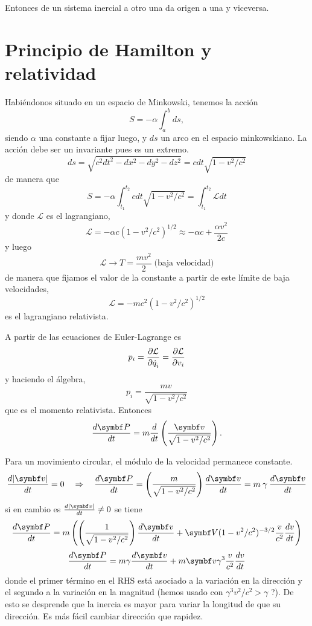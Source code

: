 \documentclass[10pt,oneside]{CBFT_book}
\begin{document}
Entonces de un sistema inercial a otro una  da origen a una  y viceversa.

\section{Principio de Hamilton y relatividad}

Habiéndonos situado en un espacio de Minkowski, tenemos la acción
\[
	S = -\alpha \int_a^b ds,
\]
siendo $\alpha$ una constante a fijar luego, y $ds$ un arco en el espacio minkowskiano. La acción debe ser 
un invariante pues es un extremo.
\[
	ds = \sqrt{ c^2 dt^2 - dx^2 - dy^2 - dz^2 } = c dt \sqrt{ 1 - v^2/c^2 }
\]
de manera que 
\[
	S = -\alpha \int_{t_1}^{t_2} c dt  \sqrt{ 1 - v^2/c^2 } = \int_{t_1}^{t_2} \mathcal{L} dt
\]
y donde $\mathcal{L}$ es el lagrangiano, 
\[
	\mathcal{L} = -\alpha c \left( 1 - v^2/c^2 \right)^{1/2} \approx -\alpha c + \frac{\alpha v^2}{2c}
\]
y luego 
\[
	\mathcal{L} \to T = \frac{m v^2}{2} \; \text{(baja velocidad)}
\]
de manera que fijamos el valor de la constante a partir de este límite de baja velocidades,
\[
	\mathcal{L} = -m c^2 \left( 1 - v^2/c^2 \right)^{1/2}
\]
es el lagrangiano relativista.

A partir de las ecuaciones de Euler-Lagrange es 
\[
	p_i = \frac{\partial^{\hspace{-0.05em}} {\mathcal{L}}}{\partial {\dot{q}_i}^{\hspace{-0.05em}}} = \frac{\partial^{\hspace{-0.05em}} {\mathcal{L}}}{\partial {v_i}^{\hspace{-0.05em}}}
\]
y haciendo el álgebra,
\[
	p_i = \frac{ m v }{\sqrt{ 1 - v^2/c^2 }}
\]
que es el momento relativista. Entonces
\[
	\dtot{\vb{P}}{t} = m \dtot{}{t}\left( \frac{\vb{v}}{\sqrt{1 - v^2/c^2 }}\right).
\]

Para un movimiento circular, el módulo de la velocidad permanece constante.
\[
	\dtot{|\vb{v}|}{t} = 0 \quad \Rightarrow \quad \dtot{\vb{P}}{t} =
		\left( \frac{ m }{\sqrt{1 - v^2/c^2 }}\right) \dtot{\vb{v}}{t} =
		m \: \gamma \: \dtot{\vb{v}}{t}
\]
si en cambio es $ \dtot{|\vb{v}|}{t} \neq 0 $ se tiene 
\[
	\dtot{\vb{P}}{t} = m \left( \left( \frac{ 1 }{\sqrt{1 - v^2/c^2 }}\right) \dtot{\vb{v}}{t} 
	+ \vb{V} (1 - v^2/c^2)^{-3/2} \frac{v}{c^2} \dtot{v}{t} \right)
\]
\[
	\dtot{\vb{P}}{t} = m \gamma \dtot{\vb{v}}{t} + m \vb{v} \gamma^3 \frac{v}{c^2} \dtot{v}{t}
\]
donde el primer término en el RHS está asociado a la variación en la dirección y el segundo a la variación
en la magnitud (hemos usado con $ \gamma^3 v^2/c^2 > \gamma $ ?). De esto se desprende que la inercia es
mayor para variar la longitud de  que su dirección. Es más fácil cambiar dirección que rapidez.
\end{document}
